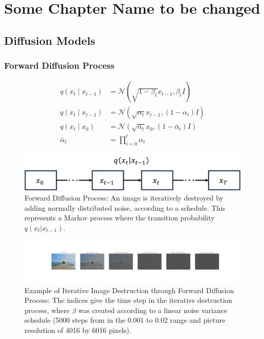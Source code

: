 \chapter{Some Chapter Name to be changed}

\section{Diffusion Models}
\subsection{Forward Diffusion Process}

\begin{equation}
	\begin{split}
		q(x_t\mid x_{t-1}) & = \mathcal{N}(\sqrt{1-\beta_t} x_{t-1}, \beta_t I) \\
		q(x_t\mid x_{t-1}) & = \mathcal{N}(\sqrt{\alpha_t} x_{t-1}, (1-\alpha_t) I) \\
		q(x_t\mid x_{0}) & = \mathcal{N}(\sqrt{\bar{\alpha}_t} x_{0}, (1 - \bar{\alpha}_t) I) \\
		\bar{\alpha}_t & = \prod_{i=0}^{t} \alpha_t 
	\end{split}
\end{equation}

\begin{figure}[h]
    \centering
    \includegraphics[width=.5\textwidth]{img/forward_diffusion.png}
    \caption{Forward Diffusion Process: An image is iteratively destroyed by adding normally distributed noise, 
    according to a schedule. This represents a Markov process where the transition probability $q(x_t|x_{t-1})$.}
    \label{fig:forward_diffusion}
\end{figure}

\begin{figure}
    \centering
    \includegraphics[width=\textwidth]{img/forward_naoshima.png}
    \caption{Example of Iterative Image Destruction through Forward Diffusion Process:
    The indices give the time step in the iterative destruction process, where $\beta$ was created according to a linear noise variance schedule (5000 steps from in the 0.001 to 0.02 range and picture resolution of 4016 by 6016 pixels).}
\end{figure}